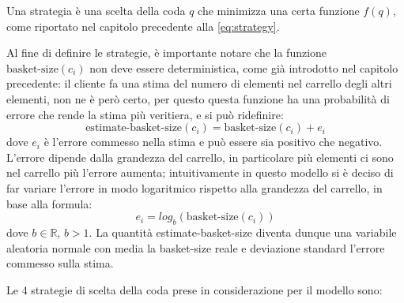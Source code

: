 Una strategia è una scelta della coda $q$ che minimizza una certa funzione $f(q)$, come riportato nel capitolo precedente alla \ref{eq:strategy}. 

Al fine di definire le strategie, è importante notare che la funzione $\text{basket-size}(c_i)$ non deve essere deterministica, come già introdotto nel capitolo precedente: il cliente fa una stima del numero di elementi nel carrello degli altri elementi, non ne è però certo, per questo questa funzione ha una probabilità di errore che rende la stima più veritiera, e si può ridefinire:
\begin{equation}\label{eq:estimate-basket-size}
\text{estimate-basket-size}(c_i) = \text{basket-size}(c_i) + e_i
\end{equation}
dove $e_i$ è l'errore commesso nella stima e può essere sia positivo che negativo. L'errore dipende dalla grandezza del carrello, in particolare più elementi ci sono nel carrello più l'errore aumenta; intuitivamente in questo modello si è deciso di far variare l'errore in modo logaritmico rispetto alla grandezza del carrello, in base alla formula:
\begin{equation}\label{eq:error-basket-size}
e_i = log_b (\text{basket-size}(c_i))
\end{equation}
dove $b \in \mathbb{R}$, $b > 1$. 
La quantità estimate-basket-size diventa dunque una variabile aleatoria normale con media la basket-size reale e deviazione standard l'errore commesso sulla stima.

Le 4 strategie di scelta della coda prese in considerazione per il modello sono:

